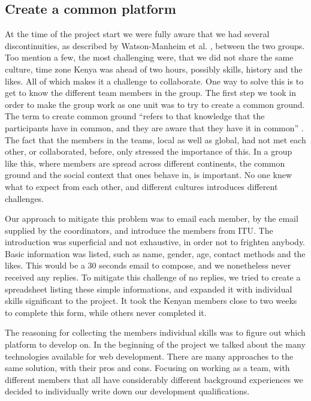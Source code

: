 \subsection{Create a common platform} \label{sec:commonplatform}
At the time of the project start we were fully aware that we had several discontinuities, as described by Watson-Manheim et al. \cite{watson2007distance}, between the two groups. Too mention a few, the most challenging were, that we did not share the same culture, time zone \textemdash Kenya was ahead of two hours\textemdash, possibly skills, history and the likes. All of which makes it a challenge to collaborate. One way to solve this is to get to know the different team members in the group. The first step we took in order to make the group work as one unit was to try to create a common ground. The term to create common ground ``refers to that knowledge that the participants have in common, and they are aware that they have it in common'' \cite{olson:2000:distance}. The fact that the members in the teams, local as well as global, had not met each other, or collaborated, before, only stressed the importance of this. In a group like this, where members are spread across different continents, the common ground and the social context that ones behave in, is important. No one knew what to expect from each other, and different cultures introduces different challenges. 

Our approach to mitigate this problem was to email each member, by the email supplied by the coordinators, and introduce the members from ITU. The introduction was superficial and not exhaustive, in order not to frighten anybody. Basic information was listed, such as name, gender, age, contact methods and the likes. This would be a 30 seconds email to compose, and we nonetheless never received any replies. To mitigate this challenge of no replies, we tried to create a spreadsheet listing these simple informations, and expanded it with individual skills significant to the project. It took the Kenyan members close to two weeks to complete this form, while others never completed it.

The reasoning for collecting the members individual skills was to figure out which platform to develop on. In the beginning of the project we talked about the many technologies available for web development. There are many approaches to the same solution, with their pros and cons. Focusing on working as a team, with different members that all have considerably different background experiences we decided to individually write down our development qualifications.

